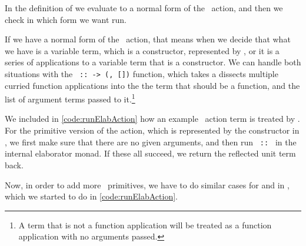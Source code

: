 In the definition of  we evaluate  to a normal form
of the \Elab\ action, and then we check in  which form we want run.

If we have a normal form of the \Elab\ action, that means when we decide
that what we have is a variable term, which is a constructor, represented by
, or it is a series of applications to a variable term that is a
constructor. We can handle both situations with the
\texttt{ ::  -> (, [])} function,
which takes a dissects multiple curried function applications into the the term
that should be a function, and the list of argument terms passed to
it.\footnote{A term that is not a function application will be treated as a
function application with no arguments passed.}

We included in \autoref{code:runElabAction} how an example \Elab\ action
term is treated by . For the primitive version of the 
action, which is represented by the  constructor in \Elab,
we first make sure that there are no given arguments, and then run
\texttt{ ::   \ty{()}} in the internal elaborator
monad. If these all succeed, we return the reflected unit term back.

Now, in order to add more \Elab\ primitives, we have to do similar cases for
 and  in , which we
started to do in \autoref{code:runElabAction}.

